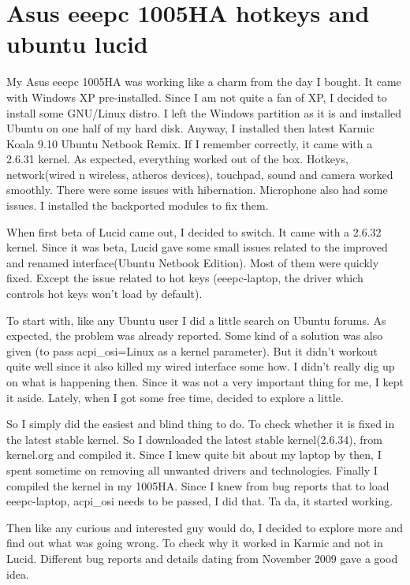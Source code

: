 \section*{Asus eeepc 1005HA hotkeys and ubuntu lucid}
\vskip 2pt

My Asus eeepc 1005HA was working like a charm from the day I bought. 
It came with Windows XP pre-installed. Since I am not quite a fan of XP, I 
decided to install some GNU/Linux distro. I left the Windows partition as 
it is and installed Ubuntu on one half of my hard disk. Anyway, I installed 
then latest Karmic Koala 9.10 Ubuntu Netbook Remix. If I remember correctly, 
it came with a 2.6.31 kernel. As expected, everything worked out of the box.
 Hotkeys, network(wired n wireless, atheros devices), touchpad, sound and camera 
worked smoothly. There were some issues with hibernation. Microphone also had some 
issues. I installed the backported modules to fix them.

When first beta of Lucid came out, I decided to switch. It came with a 2.6.32 kernel. 
Since it was beta, Lucid gave some small issues related to the improved and renamed 
interface(Ubuntu Netbook Edition). Most of them were quickly fixed. Except the issue 
related to hot keys (eeepc-laptop, the driver which controls hot keys won’t load by default).

To start with, like any Ubuntu user I did a little search on Ubuntu forums. As expected, 
the problem was already reported. Some kind of a solution was also given 
(to pass acpi\_osi=Linux as a kernel parameter). But it didn’t workout quite well since 
it also killed my wired interface some how. I didn’t really dig up on what is happening 
then. Since it was not a very important thing for me, I kept it aside. Lately, when I 
got some free time, decided to explore a little.

So I simply did the easiest and blind thing to do. To check whether it is fixed in the 
latest stable kernel. So I downloaded the latest stable kernel(2.6.34), from kernel.org 
and compiled it. Since I knew quite bit about my laptop by then, I spent sometime on 
removing all unwanted drivers and technologies. Finally I compiled the kernel in my 1005HA. 
Since I knew from bug reports that to load eeepc-laptop, acpi\_osi needs to be passed, 
I did that. Ta da,  it started working.

Then like any curious and interested guy would do, I decided to explore more and find out 
what was going wrong. To check why it worked in Karmic and not in Lucid. 
Different bug reports and details dating from November 2009 gave a good idea.

